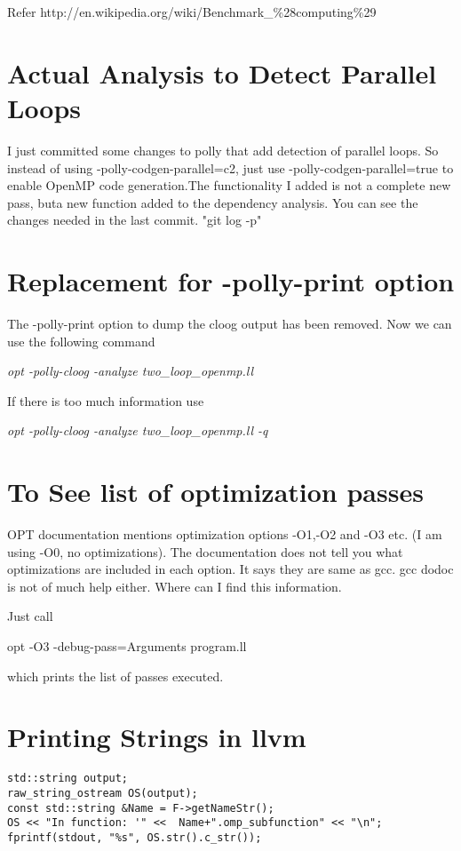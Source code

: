 \documentclass[a4paper,10pt]{article}
\begin{document}
Refer http://en.wikipedia.org/wiki/Benchmark\_\%28computing\%29

\section{Actual Analysis to Detect Parallel Loops}

I just committed some changes to polly that add detection of parallel loops. So instead of using -polly-codgen-parallel=c2, just use -polly-codgen-parallel=true to enable OpenMP code generation.The functionality I added is not a complete new pass, buta new function added to the dependency analysis. You can see the changes needed in the last commit. "git log -p"



\section{Replacement for -polly-print option}

The -polly-print option to dump the cloog output has been removed. Now we can use the following command

\emph{opt -polly-cloog -analyze two\_loop\_openmp.ll}

If there is too much information use

\emph{opt -polly-cloog -analyze two\_loop\_openmp.ll -q}

\section{To See list of optimization passes}

OPT documentation mentions optimization options -O1,-O2 and -O3 etc.
(I am using -O0, no optimizations). The documentation does not tell
 you what optimizations are included in each option.  It says they are
 same as gcc.  gcc dodoc is not of much help either.  Where can I find
 this information.

Just call

opt -O3 -debug-pass=Arguments program.ll

which prints the list of passes executed.

\section{Printing Strings in llvm}

\begin{verbatim}
std::string output;
raw_string_ostream OS(output);
const std::string &Name = F->getNameStr();
OS << "In function: '" <<  Name+".omp_subfunction" << "\n";
fprintf(stdout, "%s", OS.str().c_str());

\end{verbatim}
\end{document}
